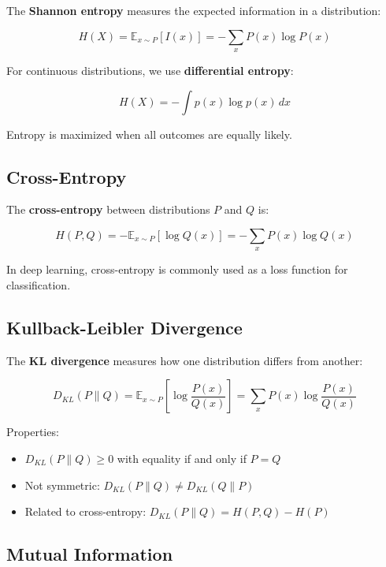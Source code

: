 The \textbf{Shannon entropy} measures the expected information in a distribution:

\begin{equation}
H(X) = \mathbb{E}_{x \sim P}[I(x)] = -\sum_{x} P(x) \log P(x)
\end{equation}

For continuous distributions, we use \textbf{differential entropy}:

\begin{equation}
H(X) = -\int p(x) \log p(x) \, dx
\end{equation}

Entropy is maximized when all outcomes are equally likely.

\subsection{Cross-Entropy}

The \textbf{cross-entropy} between distributions $P$ and $Q$ is:

\begin{equation}
H(P, Q) = -\mathbb{E}_{x \sim P}[\log Q(x)] = -\sum_{x} P(x) \log Q(x)
\end{equation}

In deep learning, cross-entropy is commonly used as a loss function for classification.

\subsection{Kullback-Leibler Divergence}

The \textbf{KL divergence} measures how one distribution differs from another:

\begin{equation}
D_{KL}(P \| Q) = \mathbb{E}_{x \sim P}\left[\log \frac{P(x)}{Q(x)}\right] = \sum_{x} P(x) \log \frac{P(x)}{Q(x)}
\end{equation}

Properties:
\begin{itemize}
    \item $D_{KL}(P \| Q) \geq 0$ with equality if and only if $P = Q$
    \item Not symmetric: $D_{KL}(P \| Q) \neq D_{KL}(Q \| P)$
    \item Related to cross-entropy: $D_{KL}(P \| Q) = H(P, Q) - H(P)$
\end{itemize}

\subsection{Mutual Information}


